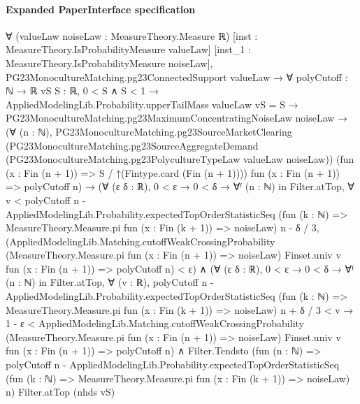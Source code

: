 \documentclass[10pt]{article}
\begin{document}
\paragraph{Expanded PaperInterface specification}
\begin{ReviewVerbatim}
∀ (valueLaw noiseLaw : MeasureTheory.Measure ℝ) [inst : MeasureTheory.IsProbabilityMeasure valueLaw]
  [inst_1 : MeasureTheory.IsProbabilityMeasure noiseLaw],
  PG23MonocultureMatching.pg23ConnectedSupport valueLaw →
    ∀ {polyCutoff : ℕ → ℝ} {vS S : ℝ},
      0 < S ∧ S < 1 →
        AppliedModelingLib.Probability.upperTailMass valueLaw vS = S →
          PG23MonocultureMatching.pg23MaximumConcentratingNoiseLaw noiseLaw →
            (∀ (n : ℕ),
                PG23MonocultureMatching.pg23SourceMarketClearing
                  (PG23MonocultureMatching.pg23SourceAggregateDemand
                    (PG23MonocultureMatching.pg23PolycultureTypeLaw valueLaw noiseLaw))
                  (fun (x : Fin (n + 1)) => S / ↑(Fintype.card (Fin (n + 1)))) fun (x : Fin (n + 1)) => polyCutoff n) →
              (∀ (ε δ : ℝ),
                  0 < ε →
                    0 < δ →
                      ∀ᶠ (n : ℕ) in Filter.atTop,
                        ∀
                          v <
                            polyCutoff n -
                                AppliedModelingLib.Probability.expectedTopOrderStatisticSeq
                                  (fun (k : ℕ) => MeasureTheory.Measure.pi fun (x : Fin (k + 1)) => noiseLaw) n -
                              δ / 3,
                          (AppliedModelingLib.Matching.cutoffWeakCrossingProbability
                              (MeasureTheory.Measure.pi fun (x : Fin (n + 1)) => noiseLaw) Finset.univ v
                              fun (x : Fin (n + 1)) => polyCutoff n) <
                            ε) ∧
                (∀ (ε δ : ℝ),
                    0 < ε →
                      0 < δ →
                        ∀ᶠ (n : ℕ) in Filter.atTop,
                          ∀ (v : ℝ),
                            polyCutoff n -
                                    AppliedModelingLib.Probability.expectedTopOrderStatisticSeq
                                      (fun (k : ℕ) => MeasureTheory.Measure.pi fun (x : Fin (k + 1)) => noiseLaw) n +
                                  δ / 3 <
                                v →
                              1 - ε <
                                AppliedModelingLib.Matching.cutoffWeakCrossingProbability
                                  (MeasureTheory.Measure.pi fun (x : Fin (n + 1)) => noiseLaw) Finset.univ v
                                  fun (x : Fin (n + 1)) => polyCutoff n) ∧
                  Filter.Tendsto
                    (fun (n : ℕ) =>
                      polyCutoff n -
                        AppliedModelingLib.Probability.expectedTopOrderStatisticSeq
                          (fun (k : ℕ) => MeasureTheory.Measure.pi fun (x : Fin (k + 1)) => noiseLaw) n)
                    Filter.atTop (nhds vS)
\end{ReviewVerbatim}
\end{document}
